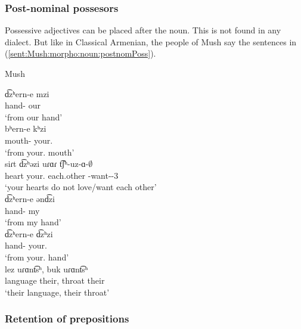 \subsubsection{Post-nominal possesors} 

Possessive adjectives can be placed after the noun. This is not found in any dialect. But like in Classical Armenian, the people of Mush say the sentences in (\ref{sent:Mush:morpho:noun:postnomPoss}).

\newpage
\begin{exe}
	\ex Mush \label{sent:Mush:morpho:noun:postnomPoss}
	\begin{xlist}
		\ex \gll d͡zʰern-e mzi \\
		hand-{\abl} our \\
		\trans `from our hand' \\
		\ex \gll bʰern-e kʰzi \\
		mouth-{\abl} your.{\sg} \\
		\trans `from your.{\sg} mouth' \\
		\ex \gll siɾt d͡zʰəzi uɾɑɾ t͡ʃʰ-uz-ɑ-$\emptyset$ \\
		heart your.{\pl} each.other {\neggloss}-want-{\thgloss}-3{\sg} \\
		\trans `your hearts do not love/want each other' \\
		\ex \gll d͡zʰern-e ənd͡zi \\
		hand-{\abl} my \\
		\trans `from my hand' \\
		\ex \gll d͡zʰern-e d͡zʰzi \\
		hand-{\abl} your.{\pl} \\
		\trans `from your.{\pl} hand' \\
		\ex \gll lez uɾɑnt͡sʰ, buk uɾɑnt͡sʰ \\
		language their, throat their \\ 
		\trans `their language, their throat' \\
		
	\end{xlist}
\end{exe}

\begin{adjarianpage}\label{page:119}\end{adjarianpage}%


\subsubsection{Retention of prepositions} 

